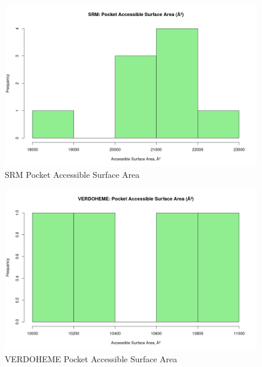 	\begin{figure}
		\caption{SRM Pocket Accessible Surface Area}
		\label{figs:SRM_pocketAccSA}
		\includegraphics[width=\linewidth]{7A/SRM_pocketAccSA}
	\end{figure}

	\begin{figure}
		\caption{VERDOHEME Pocket Accessible Surface Area}
		\label{figs:VERDOHEME_pocketAccSA}
		\includegraphics[width=\linewidth]{7A/VERDOHEME_pocketAccSA}
	\end{figure}

